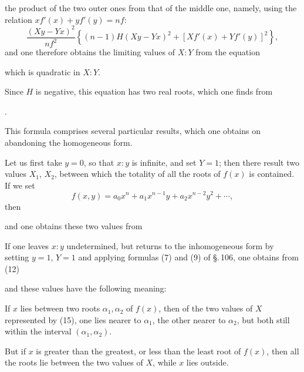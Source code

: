 the product of the two outer ones from that of the middle one, namely,
using the relation $xf'(x) + yf'(y) = nf$:
\[
\frac{(Xy - Yx)^2}{nf^2}\left\{(n-1)H(Xy - Yx)^2 + [Xf'(x) + Yf'(y)]^2\right\},
\]
and one therefore obtains the limiting values of $X:Y$ from the equation


which is quadratic in $X:Y$.

Since $H$ is negative, this equation has two real roots,
which one finds from


.

This formula comprises several particular results, which one
obtains on abandoning the homogeneous form.

Let us first take $y = 0$, so that $x:y$ is infinite, and
set $Y = 1$; then there result two values $X_1$, $X_2$, between
which the totality of all the roots of $f(x)$ is contained.
If we set
\[
f(x, y) = a_0 x^n + a_1 x^{n-1} y + a_2 x^{n-2} y^2 + \cdots,
\]
then


and one obtains these two values from


If one leaves $x:y$ undetermined, but returns to the inhomogeneous
form by setting $y = 1$, $Y = 1$ and applying formulas
(7) and (9) of \S.\,106, one obtains from (12)


and these values have the following meaning:

If $x$ lies between two roots $\alpha_1, \alpha_2$ of $f(x)$, then of
the two values of $X$ represented by (15), one lies
nearer to $\alpha_1$, the other nearer to $\alpha_2$, but both still within
the interval $(\alpha_1, \alpha_2)$.

But if $x$ is greater than the greatest, or less than the
least root of $f(x)$, then all the roots lie
between the two values of $X$, while $x$ lies outside.
